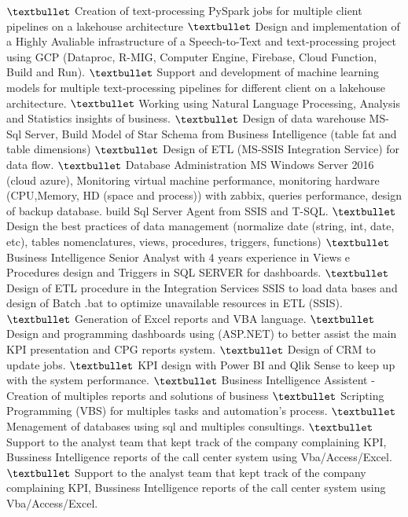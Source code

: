 \documentclass[
	a4paper,
]{fortysecondscv}
\begin{document}
\makefrontsidebar

\begin{cvtable}[3]
    	{$\textbullet$ Creation of text-processing PySpark jobs for multiple client pipelines on a lakehouse architecture
	    $\textbullet$ Design and implementation of a Highly Avaliable infrastructure of a Speech-to-Text and text-processing project using GCP (Dataproc, R-MIG, Computer Engine, Firebase, Cloud Function, Build and Run).
	    $\textbullet$ Support and development of machine learning models for multiple text-processing pipelines for different client on a lakehouse architecture.
	    $\textbullet$ Working using Natural Language Processing, Analysis and Statistics insights of business.}
	    {$\textbullet$ Design of data warehouse MS-Sql Server, Build Model of Star Schema from Business Intelligence (table fat and table dimensions)
	    $\textbullet$ Design of ETL (MS-SSIS Integration Service) for data flow.
	    $\textbullet$ Database Administration MS Windows Server 2016 (cloud azure), Monitoring virtual machine performance, monitoring hardware (CPU,Memory, HD (space and process)) with zabbix, queries performance, design of backup database. build Sql Server Agent from SSIS and T-SQL.
	    $\textbullet$ Design the best practices of data management (normalize date (string, int, date, etc), tables nomenclatures, views, procedures, triggers, functions)}
    	{$\textbullet$ Business Intelligence Senior Analyst with 4 years experience in Views e Procedures design and Triggers in SQL SERVER for dashboards.
    	$\textbullet$ Design of ETL procedure in the Integration Services SSIS to load data bases and design of Batch .bat to optimize unavailable resources in ETL (SSIS).
    	$\textbullet$ Generation of Excel reports and VBA language.
    	$\textbullet$ Design and programming dashboards using (ASP.NET) to better assist the main KPI presentation and CPG reports system.
    	$\textbullet$ Design of CRM to update jobs.
    	$\textbullet$ KPI design with Power BI and Qlik Sense to keep up with the system performance.}
        {$\textbullet$ Business Intelligence Assistent - Creation of multiples reports and solutions of business
        $\textbullet$ Scripting Programming (VBS) for multiples tasks and automation's process.
        $\textbullet$ Menagement of databases using sql and multiples consultings.}
        {$\textbullet$ Support to the analyst team that kept track of the company complaining KPI, Bussiness Intelligence reports of the call center system using Vba/Access/Excel.}
        {$\textbullet$ Support to the analyst team that kept track of the company complaining KPI, Bussiness Intelligence reports of the call center system using Vba/Access/Excel.}    
\end{cvtable}
\end{document}
